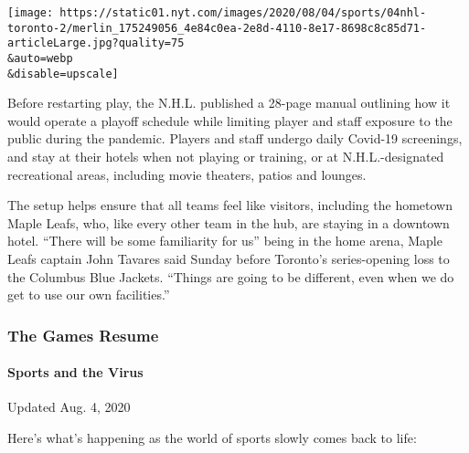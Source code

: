 \texttt{[image: https://static01.nyt.com/images/2020/08/04/sports/04nhl-toronto-2/merlin\_175249056\_4e84c0ea-2e8d-4110-8e17-8698c8c85d71-articleLarge.jpg?quality=75\\\&auto=webp\\\&disable=upscale]}

Before restarting play, the N.H.L. published a 28-page manual outlining
how it would operate a playoff schedule while limiting player and staff
exposure to the public during the pandemic. Players and staff undergo
daily Covid-19 screenings, and stay at their hotels when not playing or
training, or at N.H.L.-designated recreational areas, including movie
theaters, patios and lounges.

The setup helps ensure that all teams feel like visitors, including the
hometown Maple Leafs, who, like every other team in the hub, are staying
in a downtown hotel. ``There will be some familiarity for us'' being in
the home arena, Maple Leafs captain John Tavares said Sunday before
Toronto's series-opening loss to the Columbus Blue Jackets. ``Things are
going to be different, even when we do get to use our own facilities.''

\hypertarget{the-games-resume}{%
\subsubsection{The Games Resume}\label{the-games-resume}}

\hypertarget{sports-and-the-virus}{%
\paragraph{Sports and the Virus}\label{sports-and-the-virus}}

Updated Aug. 4, 2020

Here's what's happening as the world of sports slowly comes back to
life:


